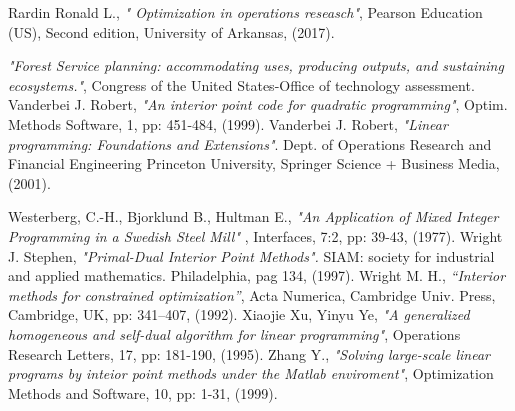 \documentclass[a4paper,10 pt,titlepage,twoside]{book}
\theoremstyle{plain}
\theoremstyle{definition}
\theoremstyle{remark}
\begin{document}
\begin{thebibliography}{9}
 Rardin Ronald L., \textit{" Optimization in operations reseasch"}, Pearson Education (US), Second edition, University of Arkansas, (2017).

 \emph{"Forest Service planning: accommodating uses, producing outputs, and sustaining ecosystems."}, Congress of the United States-Office of technology assessment.
 Vanderbei J. Robert, \emph{\;"An interior point code for quadratic programming"}, Optim. Methods Software, 1, pp: 451-484, (1999). 
 Vanderbei J. Robert, \emph{\;"Linear programming:
Foundations and Extensions"}. Dept. of Operations Research and Financial Engineering
Princeton University, Springer Science + Business Media, (2001).


 Westerberg, C.-H., Bjorklund B., Hultman E., \emph{"An Application of Mixed Integer Programming in a Swedish Steel Mill" }, Interfaces, 7:2, pp: 39-43, (1977).
 Wright J. Stephen, \emph{\;"Primal-Dual Interior Point Methods".} SIAM: society for industrial and applied mathematics. Philadelphia, pag 134, (1997).
Wright M. H.,\textit{ “Interior methods for constrained optimization”}, Acta Numerica, Cambridge Univ. Press, Cambridge, UK, pp: 341–407, (1992).
Xiaojie Xu, Yinyu Ye, \emph{"A generalized homogeneous and self-dual algorithm for linear programming"}, Operations Research Letters, 17, pp: 181-190, (1995).
Zhang Y., \textit{ "Solving large-scale linear programs by inteior point methods under
the Matlab enviroment"}, Optimization Methods and Software, 10, pp: 1-31, (1999).
\end{thebibliography}
\end{document}
